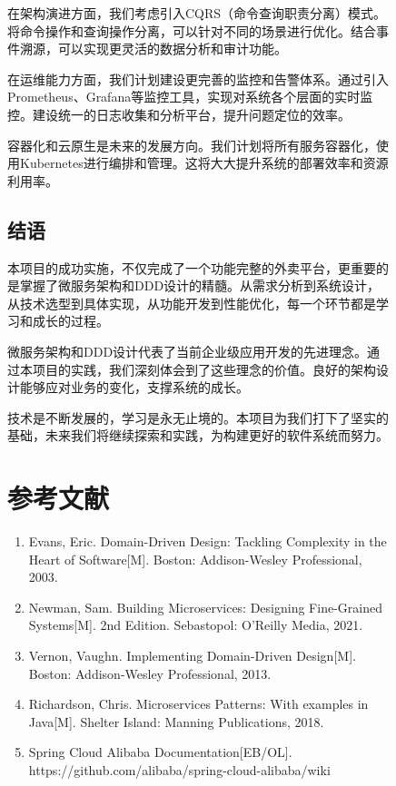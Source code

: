 \documentclass[a4paper,12pt]{article}
\begin{document}
\begin{figure}[H]
在架构演进方面，我们考虑引入CQRS（命令查询职责分离）模式。将命令操作和查询操作分离，可以针对不同的场景进行优化。结合事件溯源，可以实现更灵活的数据分析和审计功能。

在运维能力方面，我们计划建设更完善的监控和告警体系。通过引入Prometheus、Grafana等监控工具，实现对系统各个层面的实时监控。建设统一的日志收集和分析平台，提升问题定位的效率。

容器化和云原生是未来的发展方向。我们计划将所有服务容器化，使用Kubernetes进行编排和管理。这将大大提升系统的部署效率和资源利用率。

\subsection{结语}

本项目的成功实施，不仅完成了一个功能完整的外卖平台，更重要的是掌握了微服务架构和DDD设计的精髓。从需求分析到系统设计，从技术选型到具体实现，从功能开发到性能优化，每一个环节都是学习和成长的过程。

微服务架构和DDD设计代表了当前企业级应用开发的先进理念。通过本项目的实践，我们深刻体会到了这些理念的价值。良好的架构设计能够应对业务的变化，支撑系统的成长。

技术是不断发展的，学习是永无止境的。本项目为我们打下了坚实的基础，未来我们将继续探索和实践，为构建更好的软件系统而努力。

\section*{参考文献}

\begin{enumerate}
\item Evans, Eric. Domain-Driven Design: Tackling Complexity in the Heart of Software[M]. Boston: Addison-Wesley Professional, 2003.

\item Newman, Sam. Building Microservices: Designing Fine-Grained Systems[M]. 2nd Edition. Sebastopol: O'Reilly Media, 2021.

\item Vernon, Vaughn. Implementing Domain-Driven Design[M]. Boston: Addison-Wesley Professional, 2013.

\item Richardson, Chris. Microservices Patterns: With examples in Java[M]. Shelter Island: Manning Publications, 2018.

\item Spring Cloud Alibaba Documentation[EB/OL]. https://github.com/alibaba/spring-cloud-alibaba/wiki


\end{enumerate}
\end{figure}
\end{document}
